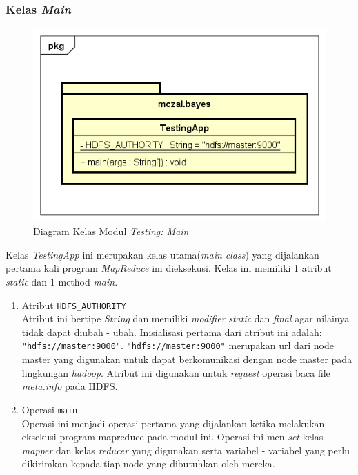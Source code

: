 \subsubsection{Kelas \textit{Main}}
\begin{figure}[H]
	\centering
	\includegraphics[scale=0.7]{ClassDiagramLengkap/CD_Test_Main}
	\caption[Diagram Kelas Modul \textit{Testing: Main}]{Diagram Kelas Modul \textit{Testing: Main}}
	\label{fig:Diagram Kelas Modul Testing: Main}
\end{figure}
	Kelas \textit{TestingApp} ini merupakan kelas utama(\textit{main class}) yang dijalankan pertama kali program \textit{MapReduce} ini dieksekusi. Kelas ini memiliki 1 atribut \textit{static} dan 1 method \textit{main}.
	\begin{enumerate}
		\item Atribut \verb|HDFS_AUTHORITY| \\
		Atribut ini bertipe \textit{String} dan memiliki \textit{modifier} \textit{static} dan \textit{final} agar nilainya tidak dapat diubah - ubah. Inisialisasi pertama dari atribut ini adalah: \verb|"hdfs://master:9000"|. \verb|"hdfs://master:9000"| merupakan url dari node master yang digunakan untuk dapat berkomunikasi dengan node master pada lingkungan \textit{hadoop}. Atribut ini digunakan untuk \textit{request} operasi baca file \textit{meta.info} pada HDFS.
		
		\item Operasi \verb|main|\\
		Operasi ini menjadi operasi pertama yang dijalankan ketika melakukan eksekusi program mapreduce pada modul ini. Operasi ini men-\textit{set} kelas \textit{mapper} dan kelas \textit{reducer} yang digunakan serta variabel - variabel yang perlu dikirimkan kepada tiap node yang dibutuhkan oleh mereka.
	\end{enumerate}


